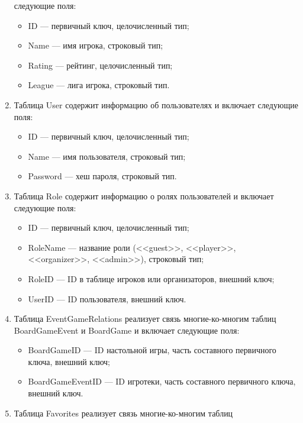 \begin{enumerate}
        следующие поля:
        \begin{itemize}[leftmargin=\parindent]
            \item ID --- первичный ключ, целочисленный тип;
            \item Name --- имя игрока, строковый тип;
            \item Rating --- рейтинг, целочисленный тип;
            \item League --- лига игрока, строковый тип.
        \end{itemize}
    \item Таблица User содержит информацию об пользователях и включает
        следующие поля:
        \begin{itemize}[leftmargin=\parindent]
            \item ID --- первичный ключ, целочисленный тип;
            \item Name --- имя пользователя, строковый тип;
            \item Password --- хеш пароля, строковый тип.
        \end{itemize}
    \item Таблица Role содержит информацию о ролях пользователей и включает
        следующие поля:
        \begin{itemize}[leftmargin=\parindent]
            \item ID --- первичный ключ, целочисленный тип;
            \item RoleName --- название роли (<<guest>>, <<player>>,
                <<organizer>>, <<admin>>), строковый тип;
            \item RoleID --- ID в таблице игроков или организаторов, внешний
                ключ;
            \item UserID --- ID пользователя, внешний ключ.
        \end{itemize}
    \item Таблица EventGameRelations реализует связь многие-ко-многим таблиц
        BoardGameEvent и BoardGame  и включает следующие поля:
        \begin{itemize}[leftmargin=\parindent]
            \item BoardGameID --- ID настольной игры, часть составного
                первичного ключа, внешний ключ;
            \item BoardGameEventID --- ID игротеки, часть составного
                первичного ключа, внешний ключ.
        \end{itemize}
    \item Таблица Favorites реализует связь многие-ко-многим таблиц

\end{enumerate}

